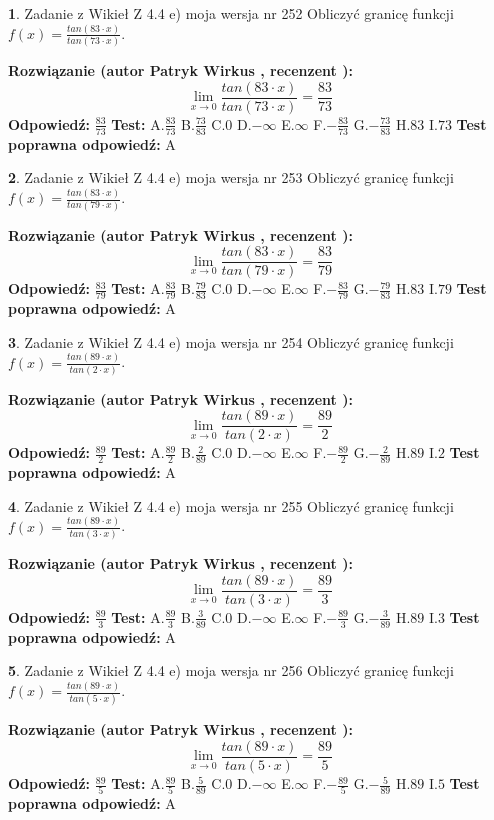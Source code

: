 \documentclass[12pt, a4paper]{article}
\theoremstyle{definition} %
\newtheorem{zad}{}
\newcommand{\zadStart}[1]{\begin{zad}#1\newline}
\newcommand{\zadStop}{\end{zad}}
\newcommand{\rozwStart}[2]{\noindent \textbf{Rozwiązanie (autor #1 , recenzent #2): }\newline}
\newcommand{\rozwStop}{\newline}
\newcommand{\odpStart}{\noindent \textbf{Odpowiedź:}\newline}
\newcommand{\odpStop}{\newline}
\newcommand{\testStart}{\noindent \textbf{Test:}\newline}
\newcommand{\testStop}{\newline}
\newcommand{\kluczStart}{\noindent \textbf{Test poprawna odpowiedź:}\newline}
\newcommand{\kluczStop}{\newline}
\begin{document}
\zadStart{Zadanie z Wikieł Z 4.4 e) moja wersja nr 252}
Obliczyć granicę funkcji $f(x)=\frac{tan(83\cdot x)}{tan(73\cdot x)}$.
\zadStop
\rozwStart{Patryk Wirkus}{}
$$\lim\limits_{x\to 0}\frac{tan(83\cdot x)}{tan(73\cdot x)}=
\frac{83}{73}$$
\rozwStop
\odpStart
$\frac{83}{73}$
\odpStop
\testStart
A.$\frac{83}{73}$
B.$\frac{73}{83}$
C.$0$
D.$-\infty$
E.$\infty$
F.$-\frac{83}{73}$
G.$-\frac{73}{83}$
H.$83$
I.$73$
\testStop
\kluczStart
A
\kluczStop



\zadStart{Zadanie z Wikieł Z 4.4 e) moja wersja nr 253}
Obliczyć granicę funkcji $f(x)=\frac{tan(83\cdot x)}{tan(79\cdot x)}$.
\zadStop
\rozwStart{Patryk Wirkus}{}
$$\lim\limits_{x\to 0}\frac{tan(83\cdot x)}{tan(79\cdot x)}=
\frac{83}{79}$$
\rozwStop
\odpStart
$\frac{83}{79}$
\odpStop
\testStart
A.$\frac{83}{79}$
B.$\frac{79}{83}$
C.$0$
D.$-\infty$
E.$\infty$
F.$-\frac{83}{79}$
G.$-\frac{79}{83}$
H.$83$
I.$79$
\testStop
\kluczStart
A
\kluczStop



\zadStart{Zadanie z Wikieł Z 4.4 e) moja wersja nr 254}
Obliczyć granicę funkcji $f(x)=\frac{tan(89\cdot x)}{tan(2\cdot x)}$.
\zadStop
\rozwStart{Patryk Wirkus}{}
$$\lim\limits_{x\to 0}\frac{tan(89\cdot x)}{tan(2\cdot x)}=
\frac{89}{2}$$
\rozwStop
\odpStart
$\frac{89}{2}$
\odpStop
\testStart
A.$\frac{89}{2}$
B.$\frac{2}{89}$
C.$0$
D.$-\infty$
E.$\infty$
F.$-\frac{89}{2}$
G.$-\frac{2}{89}$
H.$89$
I.$2$
\testStop
\kluczStart
A
\kluczStop



\zadStart{Zadanie z Wikieł Z 4.4 e) moja wersja nr 255}
Obliczyć granicę funkcji $f(x)=\frac{tan(89\cdot x)}{tan(3\cdot x)}$.
\zadStop
\rozwStart{Patryk Wirkus}{}
$$\lim\limits_{x\to 0}\frac{tan(89\cdot x)}{tan(3\cdot x)}=
\frac{89}{3}$$
\rozwStop
\odpStart
$\frac{89}{3}$
\odpStop
\testStart
A.$\frac{89}{3}$
B.$\frac{3}{89}$
C.$0$
D.$-\infty$
E.$\infty$
F.$-\frac{89}{3}$
G.$-\frac{3}{89}$
H.$89$
I.$3$
\testStop
\kluczStart
A
\kluczStop



\zadStart{Zadanie z Wikieł Z 4.4 e) moja wersja nr 256}
Obliczyć granicę funkcji $f(x)=\frac{tan(89\cdot x)}{tan(5\cdot x)}$.
\zadStop
\rozwStart{Patryk Wirkus}{}
$$\lim\limits_{x\to 0}\frac{tan(89\cdot x)}{tan(5\cdot x)}=
\frac{89}{5}$$
\rozwStop
\odpStart
$\frac{89}{5}$
\odpStop
\testStart
A.$\frac{89}{5}$
B.$\frac{5}{89}$
C.$0$
D.$-\infty$
E.$\infty$
F.$-\frac{89}{5}$
G.$-\frac{5}{89}$
H.$89$
I.$5$
\testStop
\kluczStart
A
\kluczStop
\end{document}
